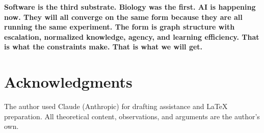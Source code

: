 \documentclass[11pt]{article}
\begin{document}
\textbf{Software is the third substrate. Biology was the first. AI is happening now. They will all converge on the same form because they are all running the same experiment. The form is graph structure with escalation, normalized knowledge, agency, and learning efficiency. That is what the constraints make. That is what we will get.}

\section*{Acknowledgments}

The author used Claude (Anthropic) for drafting assistance and \LaTeX{} preparation. All theoretical content, observations, and arguments are the author's own.
\end{document}
